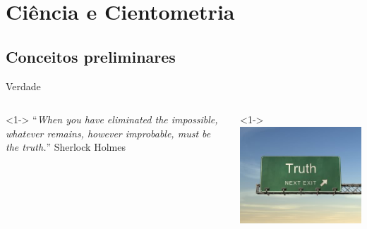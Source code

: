 \documentclass{beamer}
\begin{document}
\section{Ciência e Cientometria}

\subsection{Conceitos preliminares}


\begin{frame}{Verdade}
  \begin{columns}
    \begin{column}{6cm}<1-> ``{\em When you have eliminated the
        impossible, whatever remains, however improbable, must be the
        truth.}'' Sherlock Holmes
    \end{column}
    \begin{column}{4cm}<1->
      \includegraphics[height=0.4\textheight]{Intro/truth}
    \end{column}
  \end{columns}
\end{frame}


\end{document}
